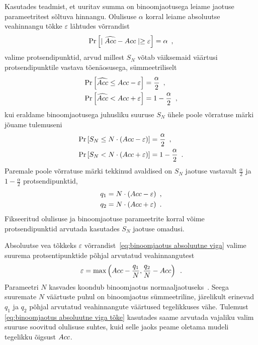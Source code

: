 Kasutades teadmist, et uuritav summa on binoomjaotusega leiame jaotuse parameetritest sõltuva hinnangu. Olulisuse $\alpha$ korral leiame absoluutse veahinnangu tõkke $\varepsilon$ lähtudes võrrandist
\begin{equation}
    \label{eq:binoomjaotus absoluutne viga}
    \Pr\left[\mid \widehat{Acc} - Acc \mid \geq \varepsilon\right] = \alpha \enspace,
\end{equation}
valime protsendipunktid, arvud millest $S_N$ võtab väiksemaid väärtusi protsendipunktile vastava tõenäosusega, sümmeetriliselt
\begin{align*}
    \Pr\left[\widehat{Acc} \leq Acc - \varepsilon\right] &= \frac{\alpha}{2} \enspace,\\
    \Pr\left[\widehat{Acc} <    Acc + \varepsilon\right] &= 1 - \frac{\alpha}{2} \enspace,
\end{align*}
kui eraldame binoomjaotusega juhusliku suuruse $S_N$ ühele poole võrratuse märki jõuame tulemuseni
\begin{align*}
    \Pr\left[S_N \leq N \cdot (Acc - \varepsilon)\right] &= \frac{\alpha}{2} \enspace,\\
    \Pr\left[S_N < N \cdot (Acc + \varepsilon)\right] &= 1 - \frac{\alpha}{2} \enspace.
\end{align*}
Paremale poole võrratuse märki tekkinud avaldised on $S_N$ jaotuse vastavalt $\frac{\alpha}{2}$ ja $1-\frac{\alpha}{2}$ protsendipunktid, 
\begin{align*}
    q_1 &= N \cdot(Acc-\varepsilon) \enspace, \\
    q_2 &= N \cdot(Acc+\varepsilon) \enspace. \\
\end{align*}
Fikseeritud olulisuse ja binoomjaotuse parameetrite korral võime protsendipunktid arvutada kasutades $S_N$ jaotuse omadusi. 

Absoluutse vea tõkkeks $\varepsilon$ võrrandist~\eqref{eq:binoomjaotus absoluutne viga} valime suurema protsentipunktide põhjal arvutatud veahinnangutest
\begin{equation}
    \label{eq:binoomjaotus absoluutne viga tõke}
    \varepsilon = \max \left( Acc - \frac{q_1}{N} , \frac{q_2}{N} - Acc \right) \enspace.
\end{equation}
Parameetri $N$ kasvades koondub binoomjaotus normaaljaotuseks~\cite{tõenäosusteooria-algkursus}. Seega suuremate $N$ väärtuste puhul on binoomjaotus sümmeetriline, järelikult erinevad $q_1$ ja $q_2$ põhjal arvutatud veahinnangute väärtused tegelikkuses vähe. Tulemust \eqref{eq:binoomjaotus absoluutne viga tõke} kasutades saame arvutada vajaliku valim suuruse soovitud olulisuse suhtes, kuid selle jaoks peame oletama mudeli tegelikku õigsust $Acc$.


